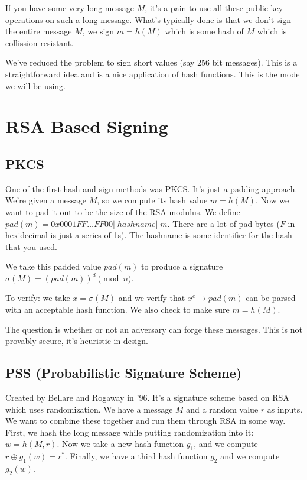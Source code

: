 \documentclass[psamsfonts]{amsart}
\begin{document}
If you have some very long message $M$, it's a pain to use all these public key operations on such a long message. What's typically done is that we don't sign the entire message $M$, we sign $m = h(M)$ which is some hash of $M$ which is collission-resistant.

We've reduced the problem to sign short values (say 256 bit messages). This is a straightforward idea and is a nice application of hash functions. This is the model we will be using.

\section{RSA Based Signing}

\subsection{PKCS}

One of the first hash and sign methods was PKCS. It's just a padding approach. We're given a message $M$, so we compute its hash value $m = h(M)$. Now we want to pad it out to be the size of the RSA modulus. We define $pad(m) = 0x0001FF \ldots FF 00 || hashname || m$. There are a lot of pad bytes ($F$ in hexidecimal is just a series of 1s). The hashname is some identifier for the hash that you used.

We take this padded value $pad(m)$ to produce a signature $\sigma(M) = (pad(m))^d \pmod{n}$.

To verify: we take $x = \sigma(M)$ and we verify that $x^e \to pad(m)$ can be parsed with an acceptable hash function. We also check to make sure $m = h(M)$.

The question is whether or not an adversary can forge these messages. This is not provably secure, it's heuristic in design.

\subsection{PSS (Probabilistic Signature Scheme)}

Created by Bellare and Rogaway in '96. It's a signature scheme based on RSA which uses randomization. We have a message $M$ and a random value $r$ as inputs. We want to combine these together and run them through RSA in some way. First, we hash the long message while putting randomization into it: $w = h(M, r)$. Now we take a new hash function $g_1$, and we compute $r \oplus g_1(w) = r^*$. Finally, we have a third hash function $g_2$ and we compute $g_2(w)$.
\end{document}
